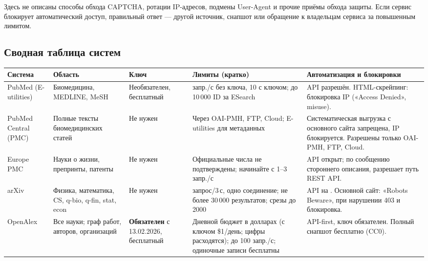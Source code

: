 \documentclass[11pt,a4paper]{article}
\newcommand{\code}[1]{\texttt{\detokenize{#1}}}
\begin{document}
\begin{notebox}
Здесь не описаны способы обхода CAPTCHA, ротации IP-адресов, подмены User-Agent и прочие приёмы обхода защиты. Если сервис блокирует автоматический доступ, правильный ответ --- другой источник, снапшот или обращение к владельцам сервиса за повышенным лимитом.
\end{notebox}

\begin{landscape}
\thispagestyle{empty}\pagestyle{empty}
\section{Сводная таблица систем}
\small
\setlength{\tabcolsep}{5pt}
\begin{longtable}{>{\raggedright\arraybackslash}p{2.7cm}>{\raggedright\arraybackslash}p{3.4cm}>{\raggedright\arraybackslash}p{3.0cm}>{\raggedright\arraybackslash}p{6.2cm}>{\raggedright\arraybackslash}p{7.6cm}}
\toprule
\textbf{Система} & \textbf{Область} & \textbf{Ключ} & \textbf{Лимиты (кратко)} & \textbf{Автоматизация и блокировки}\\
\midrule
\endhead
PubMed (E-utilities) & Биомедицина, MEDLINE, MeSH & Необязателен, бесплатный & 3 запр./с без ключа, 10 с ключом; до 10\,000 ID за ESearch & API разрешён. HTML-скрейпинг: блокировка IP («Access Denied», misuse).\\
PubMed Central (PMC) & Полные тексты биомедицинских статей & Не нужен & Через OAI-PMH, FTP, Cloud; E-utilities для метаданных & Систематическая выгрузка с основного сайта запрещена, IP блокируется. Разрешены только OAI-PMH, FTP, Cloud.\\
Europe PMC & Науки о жизни, препринты, патенты & Не нужен & Официальные числа не подтверждены; начинайте с 1--3 запр./с & API открыт; по сообщению стороннего описания, \code{robots.txt} разрешает путь REST API.\\
arXiv & Физика, математика, CS, q-bio, q-fin, stat, econ & Не нужен & 1 запрос/3\,с, одно соединение; не более 30\,000 результатов; срезы до 2000 & API на \code{export.arxiv.org}. Основной сайт: «Robots Beware», при нарушении 403 и блокировка.\\
OpenAlex & Все науки; граф работ, авторов, организаций & \textbf{Обязателен} с 13.02.2026, бесплатный & Дневной бюджет в долларах (с ключом \$1/день; цифры расходятся); до 100 запр./с; одиночные записи бесплатны & API-first, ключ обязателен. Полный снапшот бесплатно (CC0).\\

\end{longtable}
\end{landscape}
\end{document}
